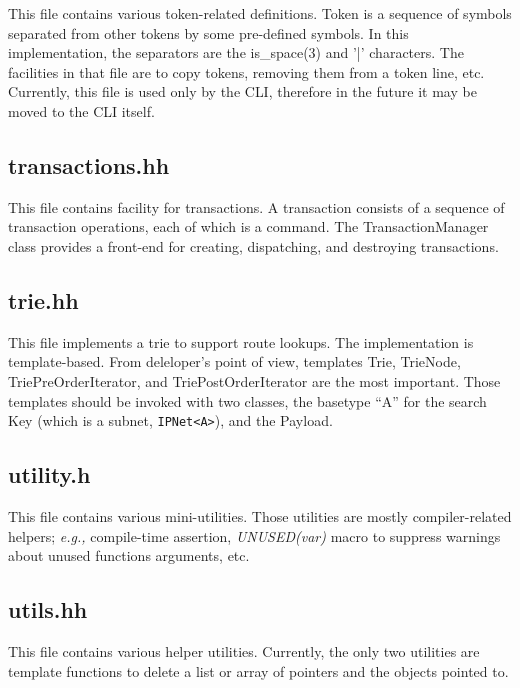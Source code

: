 \documentclass[11pt]{article}
\newcommand{\eg}{\emph{e.g.,}\xspace}
\begin{document}
This file contains various token-related definitions. Token is a
sequence of symbols separated from other tokens by some pre-defined
symbols. In this implementation, the separators are the is\_space(3) and
'|' characters.
The facilities in that file are to copy tokens, removing them from a
token line, etc.
Currently, this file is used only by the CLI, therefore in the future it
may be moved to the CLI itself.

\subsection{transactions.hh}

This file contains facility for transactions.  A transaction consists
of a sequence of transaction operations, each of which is a command.
The TransactionManager class provides a front-end for creating,
dispatching, and destroying transactions.

\subsection{trie.hh}

This file implements a trie to support route lookups.
The implementation is template-based. From deleloper's point
of view, templates Trie, TrieNode, TriePreOrderIterator,
and TriePostOrderIterator
are the most important. Those templates should be invoked with two
classes, the basetype ``A'' for the search Key (which is a subnet,
\verb=IPNet<A>=), and the Payload.

\subsection{utility.h}

This file contains various mini-utilities.  Those utilities are mostly
compiler-related helpers; \eg compile-time assertion, \emph{UNUSED(var)}
macro to suppress warnings about unused functions arguments, etc.

\subsection{utils.hh}

This file contains various helper utilities. Currently, the only two
utilities are template functions to delete a list or array
of pointers and the objects pointed to.
\end{document}
